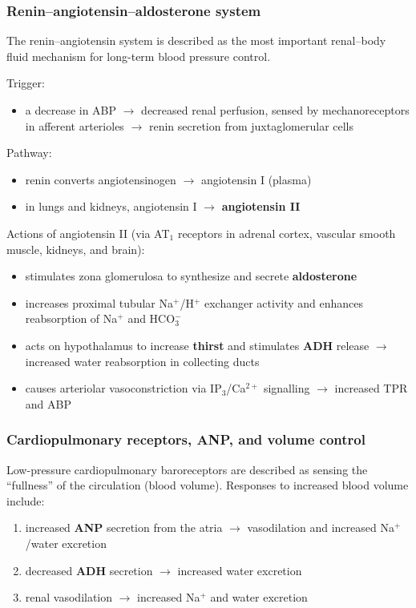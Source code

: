 \documentclass[11pt,a4paper]{article}
\begin{document}
\subsubsection{Renin--angiotensin--aldosterone system}
The renin--angiotensin system is described as the most important renal--body fluid mechanism for long-term blood pressure control.

Trigger:
\begin{itemize}
\item a decrease in ABP $\rightarrow$ decreased renal perfusion, sensed by mechanoreceptors in afferent arterioles $\rightarrow$ renin secretion from juxtaglomerular cells
\end{itemize}

Pathway:
\begin{itemize}
\item renin converts angiotensinogen $\rightarrow$ angiotensin I (plasma)
\item in lungs and kidneys, angiotensin I $\rightarrow$ \textbf{angiotensin II}
\end{itemize}

Actions of angiotensin II (via AT$_1$ receptors in adrenal cortex, vascular smooth muscle, kidneys, and brain):
\begin{itemize}
\item stimulates zona glomerulosa to synthesize and secrete \textbf{aldosterone}
\item increases proximal tubular Na$^+$/H$^+$ exchanger activity and enhances reabsorption of Na$^+$ and HCO$_3^-$
\item acts on hypothalamus to increase \textbf{thirst} and stimulates \textbf{ADH} release $\rightarrow$ increased water reabsorption in collecting ducts
\item causes arteriolar vasoconstriction via IP$_3$/Ca$^{2+}$ signalling $\rightarrow$ increased TPR and ABP
\end{itemize}

\subsubsection{Cardiopulmonary receptors, ANP, and volume control}
Low-pressure cardiopulmonary baroreceptors are described as sensing the ``fullness'' of the circulation (blood volume). Responses to increased blood volume include:
\begin{enumerate}
\item increased \textbf{ANP} secretion from the atria $\rightarrow$ vasodilation and increased Na$^+$/water excretion
\item decreased \textbf{ADH} secretion $\rightarrow$ increased water excretion
\item renal vasodilation $\rightarrow$ increased Na$^+$ and water excretion
\end{enumerate}
\end{document}
